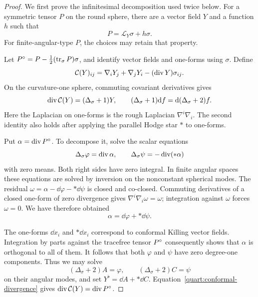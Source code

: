 \begin{proof}
We first prove the infinitesimal decomposition used twice below.  For
a symmetric tensor \(P\) on the round sphere, there are a vector
field \(Y\) and a function \(h\) such that
\begin{equation}
 P=\mathcal L_Y\sigma+h\sigma.
 \label{quart:sphere-splitting}
\end{equation}
For finite-angular-type \(P\), the choices may retain that property.

Let \(P^{\circ}=P-\frac12(\operatorname{tr}_\sigma P)\sigma\), and identify vector
fields and one-forms using \(\sigma\).  Define
\[
 \mathcal C(Y)_{ij}
   =\nabla_iY_j+\nabla_jY_i-(\operatorname{div} Y)\sigma_{ij}.
\]
On the curvature-one sphere, commuting covariant derivatives gives
\begin{equation}
 \operatorname{div}\mathcal C(Y)=(\Delta_\sigma+1)Y,
 \qquad
 (\Delta_\sigma+1)\mathrm{d} f=\mathrm{d}(\Delta_\sigma+2)f.
 \label{quart:conformal-divergence}
\end{equation}
Here the Laplacian on one-forms is the rough Laplacian
\(\nabla^i\nabla_i\).
The second identity also holds after applying the parallel Hodge star
\(*\) to one-forms.

Put \(\alpha=\operatorname{div} P^{\circ}\).  To decompose it, solve the scalar
equations
\[
 \Delta_\sigma\varphi=\operatorname{div}\alpha,\qquad
 \Delta_\sigma\psi=-\operatorname{div}(*\alpha)
\]
with zero means.  Both right sides have zero integral.  In finite
angular spaces these equations are solved by inversion on the
nonconstant spherical modes.  The residual
\(\omega=\alpha-\dd\varphi-*\dd\psi\) is closed and co-closed.
Commuting derivatives of a closed one-form of zero divergence gives
\(\nabla^i\nabla_i\omega=\omega\); integration against \(\omega\)
forces \(\omega=0\).  We have therefore obtained
\[
 \alpha=\dd\varphi+*\dd\psi.
\]

The one-forms \(\dd x_i\) and \(*\dd x_i\) correspond to conformal
Killing vector fields.  Integration by parts against the tracefree
tensor \(P^{\circ}\) consequently shows that \(\alpha\) is
orthogonal to all of them.  It follows that both \(\varphi\) and
\(\psi\) have zero degree-one components.  Thus we may solve
\[
 (\Delta_\sigma+2)A=\varphi,\qquad
 (\Delta_\sigma+2)C=\psi
\]
on their angular modes, and set \(Y^\flat=\dd A+*\dd C\).
Equation~\eqref{quart:conformal-divergence} gives
\(\operatorname{div}\mathcal C(Y)=\operatorname{div} P^{\circ}\).


\end{proof}
